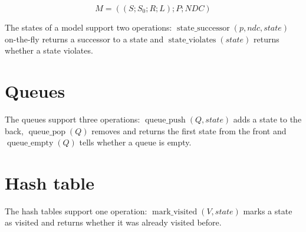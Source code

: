 \documentclass[
fancyheadings, %
%
%
]{stsreprt}
\DeclareMathOperator{\markVisited}{mark\_visited}
\DeclareMathOperator{\qEmpty}{queue\_empty}
\DeclareMathOperator{\qPop}{queue\_pop}
\DeclareMathOperator{\qPush}{queue\_push}
\DeclareMathOperator{\sSuccessor}{state\_successor}
\DeclareMathOperator{\sViolates}{state\_violates}
\begin{document}
\[M = \left(\left(S; S_0; R; L\right); P; \mathit{NDC}\right)\]

The states of a model support two operations: $\sSuccessor(p, ndc, state)$ on-the-fly returns a successor to a state and $\sViolates(state)$ returns whether a state violates.

\section{Queues}
\label{section:theory:queues}

The queues support three operations: $\qPush(Q, state)$ adds a state to the back, $\qPop(Q)$ removes and returns the first state from the front and $\qEmpty(Q)$ tells whether a queue is empty.


\section{Hash table}
\label{section:theory:hash-table}

The hash tables support one operation: $\markVisited(V, state)$ marks a state as visited and returns whether it was already visited before.

\end{document}
